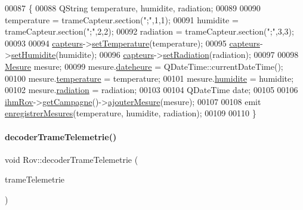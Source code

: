 \begin{DoxyCode}
00087 \{
00088     QString temperature, humidite, radiation;
00089 
00090     temperature = trameCapteur.section(\textcolor{stringliteral}{";"},1,1);
00091     humidite = trameCapteur.section(\textcolor{stringliteral}{";"},2,2);
00092     radiation = trameCapteur.section(\textcolor{stringliteral}{";"},3,3);
00093 
00094     \hyperlink{class_rov_a1b34d63d505da660be27b75ad93754c3}{capteurs}->\hyperlink{class_capteurs_a8d6a0bceb4d236edf7b51335d9be8ecd}{setTemperature}(temperature);
00095     \hyperlink{class_rov_a1b34d63d505da660be27b75ad93754c3}{capteurs}->\hyperlink{class_capteurs_aafb06e1746006cdb72e92dc7a0519a2e}{setHumidite}(humidite);
00096     \hyperlink{class_rov_a1b34d63d505da660be27b75ad93754c3}{capteurs}->\hyperlink{class_capteurs_a8692d145188df3129d88fef77efbb7b0}{setRadiation}(radiation);
00097 
00098     \hyperlink{struct_mesure}{Mesure} mesure;
00099     mesure.\hyperlink{struct_mesure_a9958b0440aca6af40028e742123afd9e}{dateheure} = QDateTime::currentDateTime();
00100     mesure.\hyperlink{struct_mesure_ad0dba8933e4b65b3781be7811f0f86ac}{temperature} = temperature;
00101     mesure.\hyperlink{struct_mesure_ad354ba4d8a32c05600859c76a8af0282}{humidite} = humidite;
00102     mesure.\hyperlink{struct_mesure_a1dae237cf09302d426ea375b9afb12f7}{radiation} = radiation;
00103 
00104     QDateTime date;
00105 
00106     \hyperlink{class_rov_a9b1c1c3b4e268a32e69b2ea4c863b817}{ihmRov}->\hyperlink{class_i_h_m_rov_ab3e8686eef9233b4c1e6711cf1c4576a}{getCampagne}()->\hyperlink{class_campagne_ab301ceaacbe1186682c2b6f3282619d0}{ajouterMesure}(mesure);
00107 
00108     emit \hyperlink{class_rov_a180b955cc5ee7e01196299377e0c5f33}{enregistrerMesures}(temperature, humidite, radiation);
00109 
00110 \}
\end{DoxyCode}
\mbox{\label{class_rov_a0d51099f9e1991ceffa0b6ed4a1c4e2e}} 
\paragraph{\texorpdfstring{decoder\+Trame\+Telemetrie()}{decoderTrameTelemetrie()}}
{\footnotesize\ttfamily void Rov\+::decoder\+Trame\+Telemetrie (\begin{DoxyParamCaption}\item[{Q\+String}]{trame\+Telemetrie }\end{DoxyParamCaption})\hspace{0.3cm}{\ttfamily [private]}}



